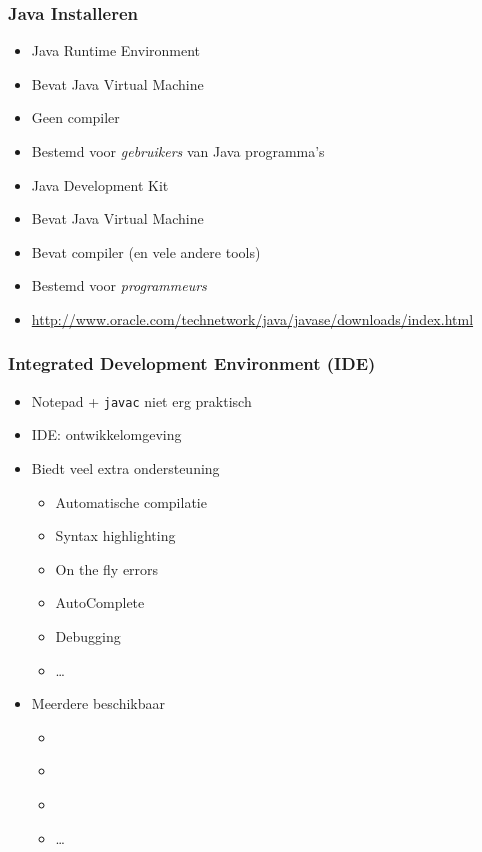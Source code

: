 \begin{frame}
  \frametitle{Java Installeren}
  \begin{itemize}
    \item Java Runtime Environment
    \item Bevat Java Virtual Machine
    \item Geen compiler
    \item Bestemd voor \emph{gebruikers} van Java programma's
  \end{itemize}
  \vskip4mm
  \begin{itemize}
    \item Java Development Kit
    \item Bevat Java Virtual Machine
    \item Bevat compiler (en vele andere tools)
    \item Bestemd voor \emph{programmeurs}
    \item \url{http://www.oracle.com/technetwork/java/javase/downloads/index.html}
  \end{itemize}
\end{frame}

\begin{frame}
  \frametitle{Integrated Development Environment (IDE)}
  \begin{itemize}
    \item Notepad + {\tt javac} niet erg praktisch
    \item IDE: ontwikkelomgeving
    \item Biedt veel extra ondersteuning
          \begin{itemize}
            \item Automatische compilatie
            \item Syntax highlighting
            \item On the fly errors
            \item AutoComplete
            \item Debugging
            \item \dots
          \end{itemize}
    \item Meerdere beschikbaar
          \begin{itemize}
            \item \href{http://www.eclipse.org}{}
            \item \href{https://netbeans.org/}{}
            \item \href{http://www.jetbrains.com/idea/}{}
            \item \dots
          \end{itemize}
  \end{itemize}
\end{frame}



